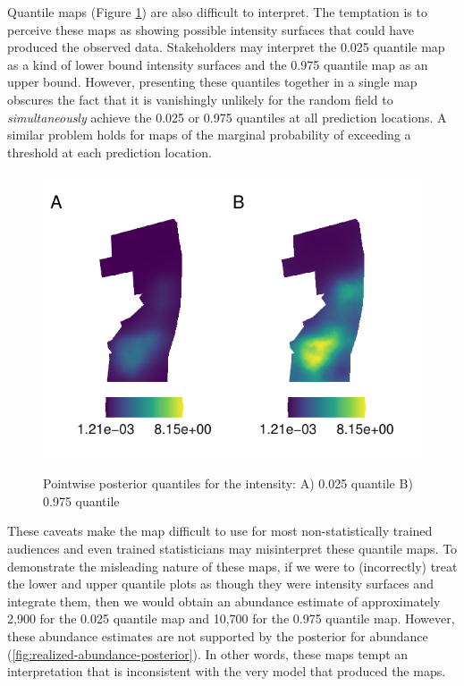 \documentclass{statsoc}
\begin{document}
Quantile maps (Figure \ref{fig:intensity-quantiles}) are also difficult to interpret. The temptation is to perceive these maps as showing possible intensity surfaces that could have produced the observed data.  Stakeholders may interpret the 0.025 quantile map as a kind of lower bound intensity surfaces and the 0.975 quantile map as an upper bound. However, presenting these quantiles together in a single map obscures the fact that it is vanishingly unlikely for the random field to \textit{simultaneously} achieve the 0.025 or 0.975 quantiles at all prediction locations.  A similar problem holds for maps of the marginal probability of exceeding a threshold at each prediction location. 
\begin{figure}[!htb]
	\begin{center}
		\includegraphics{figures/intensity_quantiles.pdf}
		\caption{Pointwise posterior quantiles for the intensity:  A) 0.025 quantile B) 0.975 quantile}
		\label{fig:intensity-quantiles}
	\end{center}
\end{figure}
These caveats make the map difficult to use for most non-statistically trained audiences and even trained statisticians may misinterpret these quantile maps.  To demonstrate the misleading nature of these maps, if we were to (incorrectly) treat the lower and upper quantile plots as though they were intensity surfaces and integrate them, then we would obtain an abundance estimate of approximately 2,900 for the 0.025 quantile map and 10,700 for the 0.975 quantile map.  However, these abundance estimates are not supported by the posterior for abundance (\autoref{fig:realized-abundance-posterior}).  In other words, these maps tempt an interpretation that is inconsistent with the very model that produced the maps.
\end{document}
